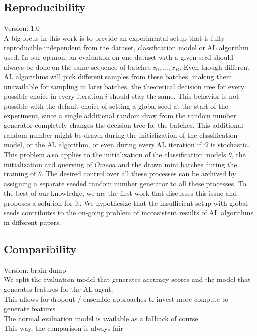 \documentclass[]{article}
\begin{document}
\subsection{Reproducibility}\label{sec:reproducibility}
{\color{red} Version: 1.0}\\
A big focus in this work is to provide an experimental setup that is fully reproducible independent from the dataset, classification model or AL algorithm used.
In our opinion, an evaluation on one dataset with a given seed should always be done on the same sequence of batches $x_0, \ldots, x_B$.
Even though different AL algorithms will pick different samples from these batches, making them unavailable for sampling in later batches, the theoretical decision tree for every possible choice in every iteration $i$ should stay the same.
This behavior is not possible with the default choice of setting a global seed at the start of the experiment, since a single additional random draw from the random number generator completely changes the decision tree for the batches.
This additional random number might be drawn during the initialization of the classification model, or the AL algorithm, or even during every AL iteration if $\Omega$ is stochastic.
This problem also applies to the initialization of the classification models $\theta$, the initialization and querying of $Omega$ and the drawn mini batches during the training of $\theta$.
The desired control over all these processes can be archived by assigning a separate seeded random number generator to all these processes.
To the best of our knowledge, we are the first work that discusses this issue and proposes a solution for it.
We hypothesize that the insufficient setup with global seeds contributes to the on-going problem of inconsistent results of AL algorithms in different papers.

\subsection{Comparibility}\label{sec:comparibility}
{\color{red} Version: brain dump}\\
We split the evaluation model that generates accuracy scores and the model that generates features for the AL agent. \\
This allows for dropout / ensemble approaches to invest more compute to generate features \\
The normal evaluation model is available as a fallback of course \\
This way, the comparison is always fair
\end{document}

